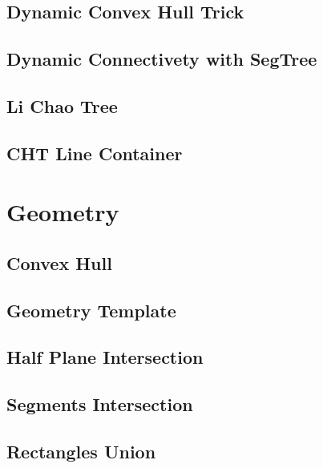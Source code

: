 \subsection{Dynamic Convex Hull Trick}
\raggedbottom
\hrulefill
\subsection{Dynamic Connectivety with SegTree}
\raggedbottom
\hrulefill
\subsection{Li Chao Tree}
\raggedbottom
\hrulefill
\subsection{CHT Line Container}
\raggedbottom
\hrulefill

\section{Geometry}
\subsection{Convex Hull}
\raggedbottom
\hrulefill
\subsection{Geometry Template}
\raggedbottom
\hrulefill
\subsection{Half Plane Intersection}
\raggedbottom
\hrulefill
\subsection{Segments Intersection}
\raggedbottom
\hrulefill
\subsection{Rectangles Union}
\raggedbottom
\hrulefill

